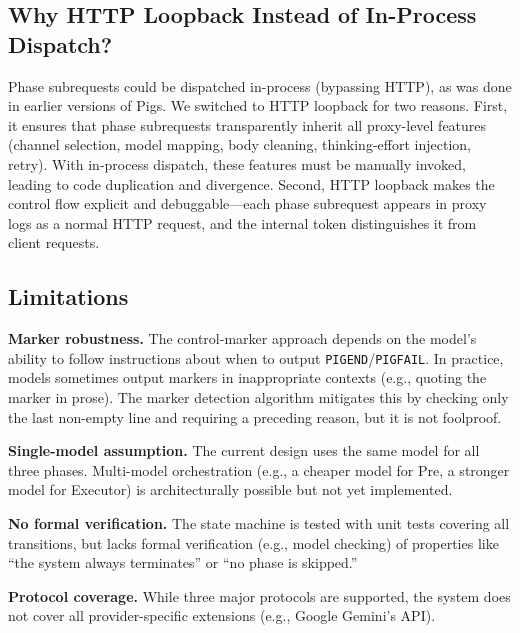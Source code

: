 \subsection{Why HTTP Loopback Instead of In-Process Dispatch?}

Phase subrequests could be dispatched in-process (bypassing HTTP), as was done in earlier versions of Pigs. We switched to HTTP loopback for two reasons. First, it ensures that phase subrequests transparently inherit all proxy-level features (channel selection, model mapping, body cleaning, thinking-effort injection, retry). With in-process dispatch, these features must be manually invoked, leading to code duplication and divergence. Second, HTTP loopback makes the control flow explicit and debuggable---each phase subrequest appears in proxy logs as a normal HTTP request, and the internal token distinguishes it from client requests.

\subsection{Limitations}

\textbf{Marker robustness.} The control-marker approach depends on the model's ability to follow instructions about when to output \texttt{PIGEND}/\texttt{PIGFAIL}. In practice, models sometimes output markers in inappropriate contexts (e.g., quoting the marker in prose). The marker detection algorithm mitigates this by checking only the last non-empty line and requiring a preceding reason, but it is not foolproof.

\textbf{Single-model assumption.} The current design uses the same model for all three phases. Multi-model orchestration (e.g., a cheaper model for Pre, a stronger model for Executor) is architecturally possible but not yet implemented.

\textbf{No formal verification.} The state machine is tested with unit tests covering all transitions, but lacks formal verification (e.g., model checking) of properties like ``the system always terminates'' or ``no phase is skipped.''

\textbf{Protocol coverage.} While three major protocols are supported, the system does not cover all provider-specific extensions (e.g., Google Gemini's API).
